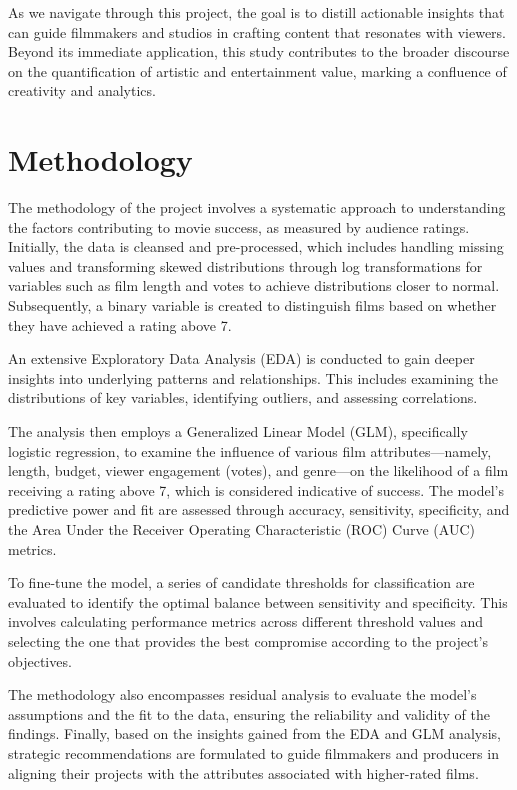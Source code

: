 \documentclass[
  11pt,
]{article}
\begin{document}
As we navigate through this project, the goal is to distill actionable
insights that can guide filmmakers and studios in crafting content that
resonates with viewers. Beyond its immediate application, this study
contributes to the broader discourse on the quantification of artistic
and entertainment value, marking a confluence of creativity and
analytics.

\hypertarget{methodology}{%
\section{Methodology}\label{methodology}}

The methodology of the project involves a systematic approach to
understanding the factors contributing to movie success, as measured by
audience ratings. Initially, the data is cleansed and pre-processed,
which includes handling missing values and transforming skewed
distributions through log transformations for variables such as film
length and votes to achieve distributions closer to normal.
Subsequently, a binary variable is created to distinguish films based on
whether they have achieved a rating above 7.

An extensive Exploratory Data Analysis (EDA) is conducted to gain deeper
insights into underlying patterns and relationships. This includes
examining the distributions of key variables, identifying outliers, and
assessing correlations.

The analysis then employs a Generalized Linear Model (GLM), specifically
logistic regression, to examine the influence of various film
attributes---namely, length, budget, viewer engagement (votes), and
genre---on the likelihood of a film receiving a rating above 7, which is
considered indicative of success. The model's predictive power and fit
are assessed through accuracy, sensitivity, specificity, and the Area
Under the Receiver Operating Characteristic (ROC) Curve (AUC) metrics.

To fine-tune the model, a series of candidate thresholds for
classification are evaluated to identify the optimal balance between
sensitivity and specificity. This involves calculating performance
metrics across different threshold values and selecting the one that
provides the best compromise according to the project's objectives.

The methodology also encompasses residual analysis to evaluate the
model's assumptions and the fit to the data, ensuring the reliability
and validity of the findings. Finally, based on the insights gained from
the EDA and GLM analysis, strategic recommendations are formulated to
guide filmmakers and producers in aligning their projects with the
attributes associated with higher-rated films.
\end{document}
